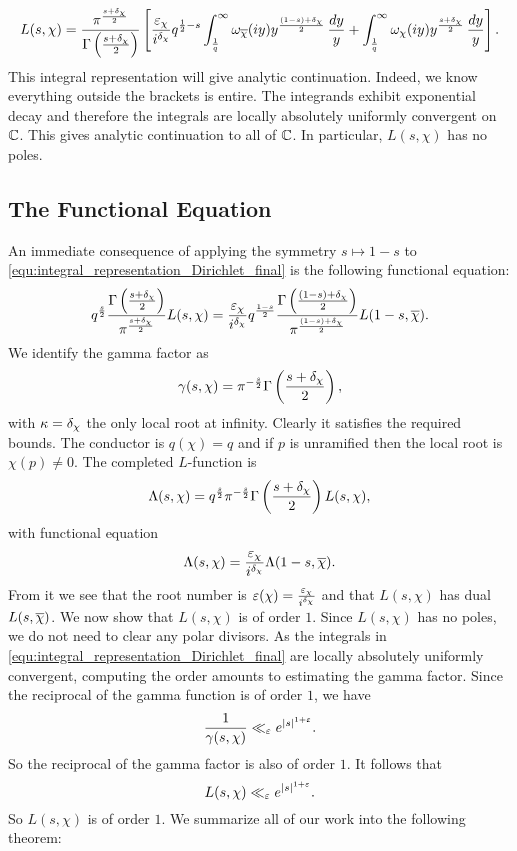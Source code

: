       \begin{equation}\label{equ:integral_representation_Dirichlet_final}
        L(s,\chi) = \frac{\pi^{\frac{s+\delta_{\chi}}{2}}}{\Gamma\left(\frac{s+\delta_{\chi}}{2}\right)}\left[\frac{\varepsilon_{\chi}}{i^{\delta_{\chi}}}q^{\frac{1}{2}-s}\int_{\frac{1}{q}}^{\infty}\omega_{\overline{\chi}}(iy)y^{\frac{(1-s)+\delta_{\chi}}{2}}\,\frac{dy}{y}+\int_{\frac{1}{q}}^{\infty}\omega_{\chi}(iy)y^{\frac{s+\delta_{\chi}}{2}}\,\frac{dy}{y}\right].
      \end{equation}
      This integral representation will give analytic continuation. Indeed, we know everything outside the brackets is entire. The integrands exhibit exponential decay and therefore the integrals are locally absolutely uniformly convergent on $\mathbb{C}$. This gives analytic continuation to all of $\mathbb{C}$. In particular, $L(s,\chi)$ has no poles.
    \subsection*{The Functional Equation}
      An immediate consequence of applying the symmetry $s \mapsto 1-s$ to \cref{equ:integral_representation_Dirichlet_final} is the following functional equation:
      \[
        q^{\frac{s}{2}}\frac{\Gamma\left(\frac{s+\delta_{\chi}}{2}\right)}{\pi^{\frac{s+\delta_{\chi}}{2}}}L(s,\chi) = \frac{\varepsilon_{\chi}}{i^{\delta_{\chi}}}q^{\frac{1-s}{2}}\frac{\Gamma\left(\frac{(1-s)+\delta_{\chi}}{2}\right)}{\pi^{\frac{(1-s)+\delta_{\chi}}{2}}}L(1-s,\overline{\chi}).
      \]
      We identify the gamma factor as
      \[
        \gamma(s,\chi) = \pi^{-\frac{s}{2}}\Gamma\left(\frac{s+\delta_{\chi}}{2}\right),
      \]
      with $\kappa = \delta_{\chi}$ the only local root at infinity. Clearly it satisfies the required bounds. The conductor is $q(\chi) = q$ and if $p$ is unramified then the local root is $\chi(p) \neq 0$. The completed $L$-function is
      \[
        \Lambda(s,\chi) = q^{\frac{s}{2}}\pi^{-\frac{s}{2}}\Gamma\left(\frac{s+\delta_{\chi}}{2}\right)L(s,\chi),
      \]
      with functional equation
      \[
        \Lambda(s,\chi) = \frac{\varepsilon_{\chi}}{i^{\delta_{\chi}}}\Lambda(1-s,\overline{\chi}).
      \]
      From it we see that the root number is $\varepsilon(\chi) = \frac{\varepsilon_{\chi}}{i^{\delta_{\chi}}}$ and that $L(s,\chi)$ has dual $L(s,\overline{\chi})$. We now show that $L(s,\chi)$ is of order $1$. Since $L(s,\chi)$ has no poles, we do not need to clear any polar divisors. As the integrals in \cref{equ:integral_representation_Dirichlet_final} are locally absolutely uniformly convergent, computing the order amounts to estimating the gamma factor. Since the reciprocal of the gamma function is of order $1$, we have
      \[
        \frac{1}{\gamma(s,\chi)} \ll_{\varepsilon} e^{|s|^{1+\varepsilon}}.
      \]
      So the reciprocal of the gamma factor is also of order $1$. It follows that
      \[
        L(s,\chi) \ll_{\varepsilon} e^{|s|^{1+\varepsilon}}.
      \]
      So $L(s,\chi)$ is of order $1$. We summarize all of our work into the following theorem:

